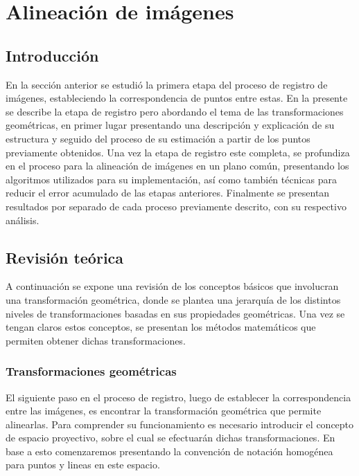 \chapter{Alineación de imágenes}
\label{capitulo4}

\section{Introducción}

En la sección anterior se estudió la primera etapa del proceso de registro de imágenes, estableciendo la correspondencia de puntos entre estas. En la presente se describe la etapa de registro pero abordando el tema de las transformaciones geométricas, en primer lugar presentando una descripción y explicación de su estructura y seguido del proceso de su estimación a partir de los puntos previamente obtenidos. Una vez la etapa de registro este completa, se profundiza en el proceso para la alineación de imágenes en un plano común, presentando los algoritmos utilizados para su implementación, así como también técnicas para reducir el error acumulado de las etapas anteriores. Finalmente se presentan resultados por separado de cada proceso previamente descrito, con su respectivo análisis.

\section{Revisión teórica}

A continuación se expone una revisión de los conceptos básicos que involucran una transformación geométrica, donde se plantea una jerarquía de los distintos niveles de transformaciones basadas en sus propiedades geométricas. Una vez se tengan claros estos conceptos, se presentan los métodos matemáticos que permiten obtener dichas transformaciones. 

\subsection{Transformaciones geométricas}

El siguiente paso en el proceso de registro, luego de establecer la correspondencia entre las imágenes, es encontrar la transformación geométrica que permite alinearlas. Para comprender su funcionamiento es necesario introducir el concepto de espacio proyectivo, sobre el cual se efectuarán dichas transformaciones. En base a esto comenzaremos presentando la convención de notación homogénea para puntos y lineas en este espacio.

